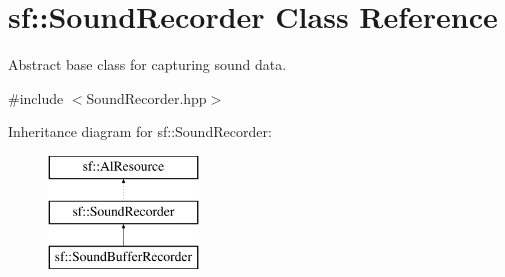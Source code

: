 \hypertarget{classsf_1_1_sound_recorder}{}\section{sf\+:\+:Sound\+Recorder Class Reference}
\label{classsf_1_1_sound_recorder}


Abstract base class for capturing sound data.  




{\ttfamily \#include $<$Sound\+Recorder.\+hpp$>$}

Inheritance diagram for sf\+:\+:Sound\+Recorder\+:\begin{figure}[H]
\begin{center}
\leavevmode
\includegraphics[height=3.000000cm]{classsf_1_1_sound_recorder}
\end{center}
\end{figure}
